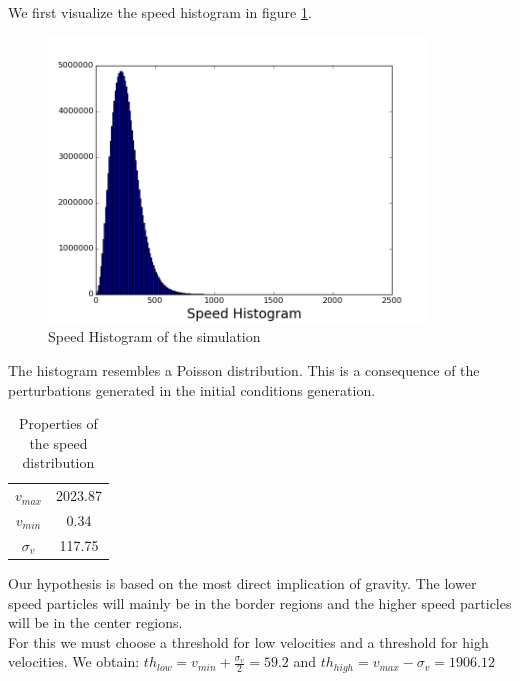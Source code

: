 \documentclass[12pt]{article}
\begin{document}
We first visualize the speed histogram in figure
 \ref{fg:hist_vel}.\\

\begin{figure}[ht]
\begin{center}
\includegraphics[width=0.9\textwidth]{graphs/hist_vel.png} %
\caption{Speed Histogram of the simulation}
\label{fg:hist_vel}
\end{center}
\end{figure}
\FloatBarrier

The histogram resembles a Poisson distribution. This is a consequence of the perturbations generated in the initial conditions generation. 

\begin{table}[ht]
    \centering
    \begin{tabular}{|c|c|}
        $v_{max}$ & 2023.87 \\
        $v_{min}$ & 0.34\\
        $\sigma_{v}$ & 117.75 
    \end{tabular}
    \caption{Properties of the speed distribution}
    \label{tab:vel}
\end{table}
\FloatBarrier

Our hypothesis is based on the most direct implication of gravity. The lower speed
particles will mainly be in the border regions and the higher speed particles
will be in the center regions. \\

For this we must choose a threshold for low velocities and a threshold for high velocities. 
We obtain: $th_{low} = v_{min} + \frac{\sigma_{v}}{2} = 59.2$ and $th_{high} = v_{max}  - \sigma_{v} = 1906.12 $
\end{document}
